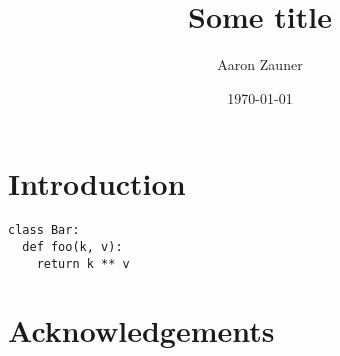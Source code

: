 \documentclass[11pt, a4paper]{article}
\title{Some title}
\date{\today}
\author{Aaron Zauner}
\begin{document}
\maketitle
\makeatletter

\let\runtitle\@title
\let\runauthor\@author

\pagestyle{fancy}
\fancyhf{}
\chead{\runtitle}
\rhead{\scriptsize\thepage}


%

%
\section{Introduction}

\begin{verbatim}
class Bar:
  def foo(k, v):
    return k ** v

\end{verbatim}

\section{Acknowledgements}


\clearpage

\end{document}
